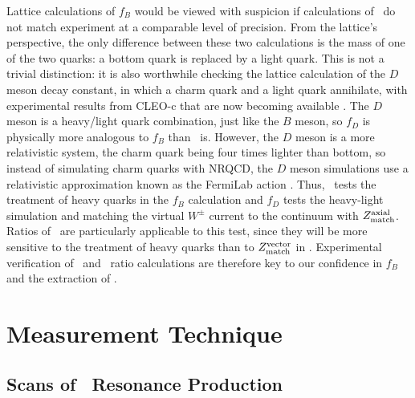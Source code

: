 \documentclass{cornell}
\begin{document}
Lattice calculations of $f_B$ would be viewed with suspicion if
calculations of \gee\ do not match experiment at a comparable level of
precision.  From the lattice's perspective, the only difference
between these two calculations is the mass of one of the two quarks: a
bottom quark is replaced by a light quark.  This is not a trivial
distinction: it is also worthwhile checking the lattice calculation of
the $D$ meson decay constant, in which a charm quark and a light quark
annihilate, with experimental results from CLEO-c that are now
becoming available \cite{fd}.  The $D$ meson is a heavy/light quark
combination, just like the $B$ meson, so $f_D$ is physically more
analogous to $f_B$ than \gee\ is.  However, the $D$ meson is a more
relativistic system, the charm quark being four times lighter than
bottom, so instead of simulating charm quarks with NRQCD, the $D$
meson simulations use a relativistic approximation known as the
FermiLab action \cite{confronts}.  Thus, \gee\ tests the treatment of
heavy quarks in the $f_B$ calculation and $f_D$ tests the heavy-light
simulation and matching the virtual $W^\pm$ current to the continuum
with $Z_{\mbox{\scriptsize match}}^{\mbox{\scriptsize axial}}$.  Ratios of \gee\ are
particularly applicable to this test, since they will be more
sensitive to the treatment of heavy quarks than to
$Z_{\mbox{\scriptsize match}}^{\mbox{\scriptsize vector}}$ in \gee.  Experimental verification of
\gee\ and \gee\ ratio calculations are therefore key to our confidence
in $f_B$ and the extraction of \vtd.

\chapter{Measurement Technique}
\label{chp:technique}

\section{Scans of \boldmath \ups\ Resonance Production}
\end{document}
